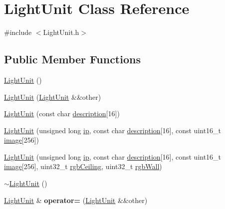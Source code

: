 \hypertarget{classLightUnit}{}\section{Light\+Unit Class Reference}
\label{classLightUnit}


{\ttfamily \#include $<$Light\+Unit.\+h$>$}

\subsection*{Public Member Functions}
\begin{DoxyCompactItemize}
\item 
\hyperlink{classLightUnit_a28169090402e0a891c35a881760e14bd}{Light\+Unit} ()
\item 
\hyperlink{classLightUnit_a171818bc7fbf21a112582ab66c39dedc}{Light\+Unit} (\hyperlink{classLightUnit}{Light\+Unit} \&\&other)
\item 
\hyperlink{classLightUnit_aa44c2d7b6e764c9bbca0f5ab19a31553}{Light\+Unit} (const char \hyperlink{classLightUnit_aad36ad5ba65b93a30ee35ef1f6895b5a}{description}\mbox{[}16\mbox{]})
\item 
\hyperlink{classLightUnit_afb696351f25e3766eb18d6ce31f97fa6}{Light\+Unit} (unsigned long \hyperlink{classLightUnit_a7d490bbccb134d200628eee46ab8fb3d}{ip}, const char \hyperlink{classLightUnit_aad36ad5ba65b93a30ee35ef1f6895b5a}{description}\mbox{[}16\mbox{]}, const uint16\+\_\+t \hyperlink{classLightUnit_a01f65fda0c55ecd8b1d62911cfa688d2}{image}\mbox{[}256\mbox{]})
\item 
\hyperlink{classLightUnit_ab91f948d033d6982b4b981aea104b1d7}{Light\+Unit} (unsigned long \hyperlink{classLightUnit_a7d490bbccb134d200628eee46ab8fb3d}{ip}, const char \hyperlink{classLightUnit_aad36ad5ba65b93a30ee35ef1f6895b5a}{description}\mbox{[}16\mbox{]}, const uint16\+\_\+t \hyperlink{classLightUnit_a01f65fda0c55ecd8b1d62911cfa688d2}{image}\mbox{[}256\mbox{]}, uint32\+\_\+t \hyperlink{classLightUnit_ae688f610193b69a2f390bd2a44dc2a7c}{rgb\+Ceiling}, uint32\+\_\+t \hyperlink{classLightUnit_a9927e4bcf968e043883688e87935fb4a}{rgb\+Wall})
\item 
\hyperlink{classLightUnit_a29969943be7a664ffc0795ec07cc12c2}{$\sim$\+Light\+Unit} ()
\item 
\hyperlink{classLightUnit}{Light\+Unit} \& {\bfseries operator=} (\hyperlink{classLightUnit}{Light\+Unit} \&\&other)\hypertarget{classLightUnit_a8c06848d212e79eecdada6751284a484}{}\label{classLightUnit_a8c06848d212e79eecdada6751284a484}

\end{DoxyCompactItemize}
